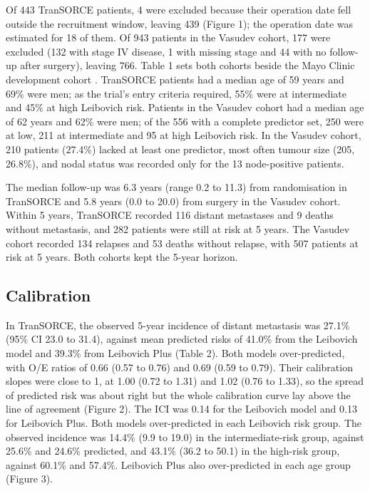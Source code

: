 \documentclass[11pt,a4paper]{article}
\begin{document}
Of 443 TranSORCE patients, 4 were excluded because their operation date fell outside the recruitment window, leaving 439 (Figure 1); the operation date was estimated for 18 of them.
Of 943 patients in the Vasudev cohort, 177 were excluded (132 with stage IV disease, 1 with missing stage and 44 with no follow-up after surgery), leaving 766.
Table 1 sets both cohorts beside the Mayo Clinic development cohort \cite{Leibovich_2003}.
TranSORCE patients had a median age of 59 years and 69\% were men; as the trial's entry criteria required, 55\% were at intermediate and 45\% at high Leibovich risk.
Patients in the Vasudev cohort had a median age of 62 years and 62\% were men; of the 556 with a complete predictor set, 250 were at low, 211 at intermediate and 95 at high Leibovich risk.
In the Vasudev cohort, 210 patients (27.4\%) lacked at least one predictor, most often tumour size (205, 26.8\%), and nodal status was recorded only for the 13 node-positive patients.

The median follow-up was 6.3 years (range 0.2 to 11.3) from randomisation in TranSORCE and 5.8 years (0.0 to 20.0) from surgery in the Vasudev cohort.
Within 5 years, TranSORCE recorded 116 distant metastases and 9 deaths without metastasis, and 282 patients were still at risk at 5 years.
The Vasudev cohort recorded 134 relapses and 53 deaths without relapse, with 507 patients at risk at 5 years.
Both cohorts kept the 5-year horizon.

\subsection*{Calibration}

In TranSORCE, the observed 5-year incidence of distant metastasis was 27.1\% (95\% CI 23.0 to 31.4), against mean predicted risks of 41.0\% from the Leibovich model and 39.3\% from Leibovich Plus (Table 2).
Both models over-predicted, with O/E ratios of 0.66 (0.57 to 0.76) and 0.69 (0.59 to 0.79).
Their calibration slopes were close to 1, at 1.00 (0.72 to 1.31) and 1.02 (0.76 to 1.33), so the spread of predicted risk was about right but the whole calibration curve lay above the line of agreement (Figure 2).
The ICI was 0.14 for the Leibovich model and 0.13 for Leibovich Plus.
Both models over-predicted in each Leibovich risk group.
The observed incidence was 14.4\% (9.9 to 19.0) in the intermediate-risk group, against 25.6\% and 24.6\% predicted, and 43.1\% (36.2 to 50.1) in the high-risk group, against 60.1\% and 57.4\%.
Leibovich Plus also over-predicted in each age group (Figure 3).
\end{document}
